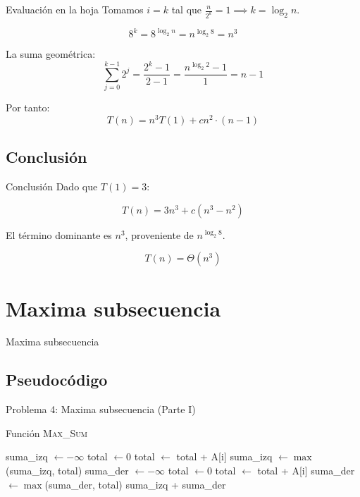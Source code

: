 \documentclass{beamer}
\begin{document}
\begin{frame}{Evaluación en la hoja}
Tomamos $i=k$ tal que $\tfrac{n}{2^k}=1 \implies k=\log_2 n$.

\[
8^k = 8^{\log_2 n} = n^{\log_2 8} = n^3
\]

La suma geométrica:
\[
\sum_{j=0}^{k-1} 2^j = \frac{2^k - 1}{2 - 1} = \frac{n^{\log_2 2}-1}{1} = {n - 1}
\]

Por tanto:
\[
T(n) = n^3 T(1) + c n^2 \cdot {(n - 1)}
\]
\end{frame}

\subsection{Conclusión}
\begin{frame}{Conclusión}
Dado que $T(1)=3$:

\[
T(n) = 3n^3 + {c}(n^3 - n^2)
\]

El término dominante es $n^3$, proveniente de $n^{\log_2 8}$.

\[
\boxed{T(n) = \Theta(n^3)}
\]

\bigskip

\end{frame}

\section{Maxima subsecuencia}
\begin{frame}{Maxima subsecuencia}
        \tableofcontents[sections={5}]
\end{frame}
\subsection{Pseudocódigo}
\begin{frame}{Problema 4: Maxima subsecuencia (Parte I)}
\begin{algorithm}[H]
\caption{Función \textsc{Max\_Sum}}
\begin{algorithmic}[1]
  \State suma\_izq $\gets -\infty$
  \State total $\gets 0$
    \State total $\gets$ total + A[i]
    \State suma\_izq $\gets \max$(suma\_izq, total)
  \EndFor
  \State suma\_der $\gets -\infty$
  \State total $\gets 0$
    \State total $\gets$ total + A[i]
    \State suma\_der $\gets \max$(suma\_der, total)
  \EndFor
  \State \Return suma\_izq + suma\_der
\EndFunction
\end{algorithmic}
\end{algorithm}
\end{frame}
\end{document}
